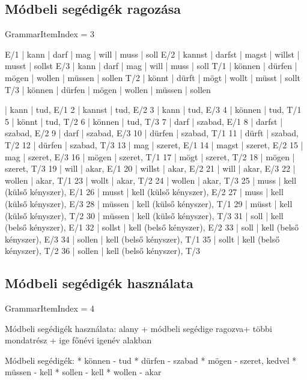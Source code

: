 \documentclass{article}
\newenvironment{desc}{\verbatim}{\endverbatim}
\newenvironment{exmp}{\verbatim}{\endverbatim}
\begin{document}
\subsection{Módbeli segédigék ragozása}

GrammarItemIndex = 3

\begin{desc}
E/1 | kann   | darf   | mag   | will   | muss   | soll 
E/2 | kannst | darfst | magst | willst | musst  | sollst 
E/3 | kann   | darf   | mag   | will   | muss   | soll 
T/1 | können | dürfen | mögen | wollen | müssen | sollen 
T/2 | könnt  | dürft  | mögt  | wollt  | müsst  | sollt 
T/3 | können | dürfen | mögen | wollen | müssen | sollen 
\end{desc}

\begin{exmp}
1 | kann | tud, E/1
2 | kannst | tud, E/2
3 | kann | tud, E/3
4 | können | tud, T/1
5 | könnt | tud, T/2
6 | können | tud, T/3
7 | darf | szabad, E/1
8 | darfst | szabad, E/2
9 | darf | szabad, E/3
10 | dürfen | szabad, T/1
11 | dürft | szabad, T/2
12 | dürfen | szabad, T/3
13 | mag | szeret, E/1
14 | magst | szeret, E/2
15 | mag | szeret, E/3
16 | mögen | szeret, T/1
17 | mögt | szeret, T/2
18 | mögen | szeret, T/3
19 | will | akar, E/1
20 | willst | akar, E/2
21 | will | akar, E/3
22 | wollen | akar, T/1
23 | wollt | akar, T/2
24 | wollen | akar, T/3
25 | muss | kell (külső kényszer), E/1
26 | musst | kell (külső kényszer), E/2
27 | muss | kell (külső kényszer), E/3
28 | müssen | kell (külső kényszer), T/1
29 | müsst | kell (külső kényszer), T/2
30 | müssen | kell (külső kényszer), T/3
31 | soll | kell (belső kényszer), E/1
32 | sollst | kell (belső kényszer), E/2
33 | soll | kell (belső kényszer), E/3
34 | sollen | kell (belső kényszer), T/1
35 | sollt | kell (belső kényszer), T/2
36 | sollen | kell (belső kényszer), T/3
\end{exmp}

\subsection{Módbeli segédigék használata}

GrammarItemIndex = 4

\begin{desc}
Módbeli segédigék használata:
alany + módbeli segédige ragozva+ többi mondatrész + ige főnévi igenév alakban 

Módbeli segédigék:
* können - tud
* dürfen - szabad
* mögen - szeret, kedvel
* müssen - kell
* sollen - kell
* wollen - akar
\end{desc}
\end{document}
